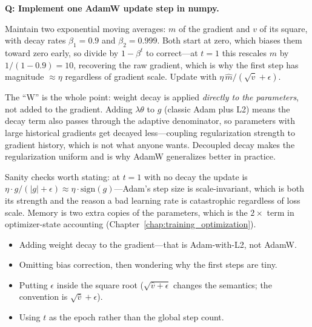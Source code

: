 \begin{interviewq}
\textbf{Q: Implement one AdamW update step in numpy.}

 \quad {} \quad \badgefreq{\freqhigh}

\stronganswer

Maintain two exponential moving averages: $m$ of the gradient and $v$ of its square, with decay rates $\beta_1 = 0.9$ and $\beta_2 = 0.999$. Both start at zero, which biases them toward zero early, so divide by $1 - \beta^t$ to correct---at $t=1$ this rescales $m$ by $1/(1-0.9) = 10$, recovering the raw gradient, which is why the first step has magnitude $\approx \eta$ regardless of gradient scale. Update with $\eta \, \hat m / (\sqrt{\hat v} + \epsilon)$.

The ``W'' is the whole point: weight decay is applied \emph{directly to the parameters}, not added to the gradient. Adding $\lambda \theta$ to $g$ (classic Adam plus L2) means the decay term also passes through the adaptive denominator, so parameters with large historical gradients get decayed less---coupling regularization strength to gradient history, which is not what anyone wants. Decoupled decay makes the regularization uniform and is why AdamW generalizes better in practice.

Sanity checks worth stating: at $t=1$ with no decay the update is $\eta \cdot g/(|g| + \epsilon) \approx \eta \cdot \mathrm{sign}(g)$---Adam's step size is scale-invariant, which is both its strength and the reason a bad learning rate is catastrophic regardless of loss scale. Memory is two extra copies of the parameters, which is the $2\times$ term in optimizer-state accounting (Chapter~\ref{chap:training_optimization}).

\redflags
\begin{itemize}
    \item Adding weight decay to the gradient---that is Adam-with-L2, not AdamW.
    \item Omitting bias correction, then wondering why the first steps are tiny.
    \item Putting $\epsilon$ inside the square root ($\sqrt{\hat v + \epsilon}$ changes the semantics; the convention is $\sqrt{\hat v} + \epsilon$).
    \item Using $t$ as the epoch rather than the global step count.
\end{itemize}



\end{interviewq}
